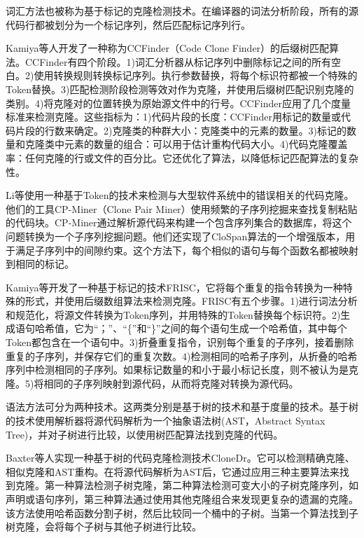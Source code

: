 词汇方法也被称为基于标记的克隆检测技术。在编译器的词法分析阶段，所有的源代码行都被划分为一个标记序列，然后匹配标记序列行。

Kamiya等人\cite{clone4}开发了一种称为CCFinder（Code Clone Finder）的后缀树匹配算法。CCFinder有四个阶段。1)词汇分析器从标记序列中删除标记之间的所有空白。2)使用转换规则转换标记序列。执行参数替换，将每个标识符都被一个特殊的Token替换。3)匹配检测阶段检测等效对作为克隆，并使用后缀树匹配识别克隆的类别。4)将克隆对的位置转换为原始源文件中的行号。CCFinder应用了几个度量标准来检测克隆。这些指标为：1)代码片段的长度：CCFinder用标记的数量或代码片段的行数来确定。2)克隆类的种群大小：克隆类中的元素的数量。3)标记的数量和克隆类中元素的数量的组合：可以用于估计重构代码大小。4)代码克隆覆盖率：任何克隆的行或文件的百分比。它还优化了算法，以降低标记匹配算法的复杂性。

Li等\cite{clone8}\cite{clone35}使用一种基于Token的技术来检测与大型软件系统中的错误相关的代码克隆。他们的工具CP-Miner（Clone Pair Miner）使用频繁的子序列挖掘\cite{clone24}来查找复制粘贴的代码块。CP-Miner通过解析源代码来构建一个包含序列集合的数据库，将这个问题转换为一个子序列挖掘问题。他们还实现了CloSpan算法\cite{clone24}的一个增强版本，用于满足子序列中的间隙约束。这个方法下，每个相似的语句与每个函数名都被映射到相同的标记。

Kamiya等\cite{clone65}开发了一种基于标记的技术FRISC，它将每个重复的指令转换为一种特殊的形式，并使用后缀数组算法来检测克隆。FRISC有五个步骤。1)进行词法分析和规范化，将源文件转换为Token序列，并用特殊的Token替换每个标识符。2)生成语句哈希值，它为“；”、“\{”和“\}”之间的每个语句生成一个哈希值，其中每个Token都包含在一个语句中。3)折叠重复指令，识别每个重复的子序列，接着删除重复的子序列，并保存它们的重复次数。4)检测相同的哈希子序列，从折叠的哈希序列中检测相同的子序列。如果标记数量的和小于最小标记长度，则不被认为是克隆。5)将相同的子序列映射到源代码，从而将克隆对转换为源代码。

语法方法可分为两种技术。这两类分别是基于树的技术和基于度量的技术。基于树的技术使用解析器将源代码解析为一个抽象语法树(AST，Abstract Syntax Tree)，并对子树进行比较，以使用树匹配算法找到克隆的代码。

Baxter等人\cite{clone13}实现一种基于树的代码克隆检测技术CloneDr。它可以检测精确克隆、相似克隆和AST重构。在将源代码解析为AST后，它通过应用三种主要算法来找到克隆。第一种算法检测子树克隆，第二种算法检测可变大小的子树克隆序列，如声明或语句序列，第三种算法通过使用其他克隆组合来发现更复杂的遗漏的克隆。该方法使用哈希函数分割子树，然后比较同一个桶中的子树。当第一个算法找到子树克隆，会将每个子树与其他子树进行比较。

